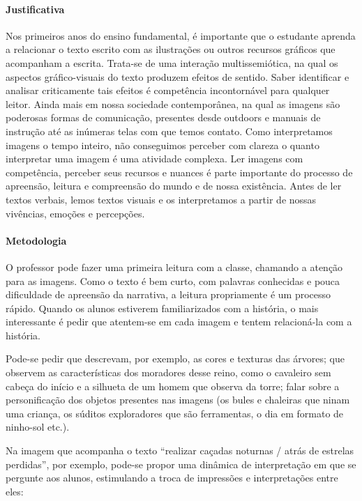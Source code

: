 \documentclass[11pt]{extarticle}
\begin{document}
\paragraph{Justificativa} Nos primeiros anos do ensino fundamental, é importante que o estudante aprenda a relacionar o texto escrito com as ilustrações ou outros recursos gráficos que acompanham a escrita. Trata-se de uma interação multissemiótica, na qual os aspectos gráfico-visuais do texto produzem efeitos de sentido. Saber identificar e analisar criticamente tais efeitos é competência incontornável para qualquer leitor. Ainda mais em nossa sociedade contemporânea, na qual as imagens são poderosas formas de comunicação, 
presentes desde outdoors e manuais de instrução até as inúmeras telas com que temos contato. Como interpretamos imagens o tempo inteiro, não conseguimos perceber com clareza o quanto interpretar uma imagem é uma atividade complexa. Ler imagens com competência, 
perceber seus recursos e nuances é parte importante do processo de apreensão, 
leitura e compreensão do mundo e de nossa existência. Antes de ler textos 
verbais, lemos textos visuais e os interpretamos a partir de nossas vivências, 
emoções e percepções.



\paragraph{Metodologia} O professor pode fazer uma primeira leitura com a classe, chamando a atenção para as imagens. Como o texto é bem curto, com palavras conhecidas e pouca dificuldade de apreensão da narrativa, a leitura propriamente é um processo rápido. Quando os alunos estiverem familiarizados com a história, o mais interessante é pedir que atentem-se em cada imagem e tentem relacioná-la com a história.

Pode-se pedir que descrevam, por exemplo, as cores e texturas das árvores; que observem as características dos moradores desse reino, como o cavaleiro sem cabeça do início e a silhueta de um homem que observa da torre; falar sobre a personificação dos objetos presentes nas imagens (os bules e chaleiras que ninam uma criança, os súditos exploradores que são ferramentas, o dia em formato de ninho-sol etc.).

Na imagem que acompanha o texto ``realizar caçadas noturnas / atrás de estrelas perdidas'', por exemplo, pode-se propor uma dinâmica de interpretação em que se pergunte aos alunos, estimulando a troca de impressões e interpretações entre eles:
\end{document}
